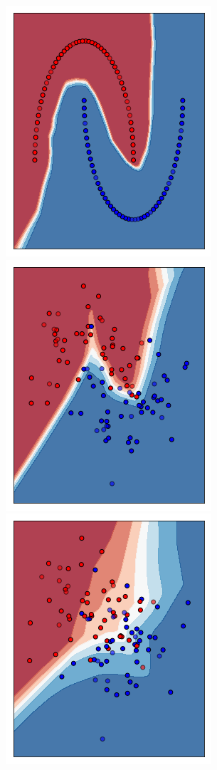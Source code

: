 \documentclass[12pt,a4paper]{report}
\begin{document}
\begin{figure}[H]
\centering
 \includegraphics[scale = 0.35]{images/moons-noise0}
 \includegraphics[scale = 0.35]{images/moons-noise0,3}
 \includegraphics[scale = 0.35]{images/moons-noise0,6}

\end{figure}
\end{document}
